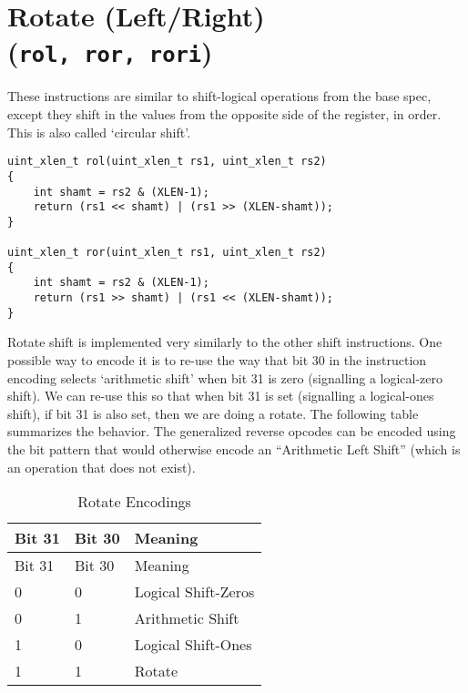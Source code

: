 \section{Rotate (Left/Right) (\texttt{rol,\ ror,\ rori})}

These instructions are similar to shift-logical operations from the base
spec, except they shift in the values from the opposite side of the
register, in order. This is also called `circular shift'.

\begin{verbatim}
uint_xlen_t rol(uint_xlen_t rs1, uint_xlen_t rs2)
{
    int shamt = rs2 & (XLEN-1);
    return (rs1 << shamt) | (rs1 >> (XLEN-shamt));
}

uint_xlen_t ror(uint_xlen_t rs1, uint_xlen_t rs2)
{
    int shamt = rs2 & (XLEN-1);
    return (rs1 >> shamt) | (rs1 << (XLEN-shamt));
}
\end{verbatim}



Rotate shift is implemented very similarly to the other shift
instructions. One possible way to encode it is to re-use the way that
bit 30 in the instruction encoding selects `arithmetic shift' when bit
31 is zero (signalling a logical-zero shift). We can re-use this so that
when bit 31 is set (signalling a logical-ones shift), if bit 31 is also
set, then we are doing a rotate. The following table summarizes the
behavior. The generalized reverse opcodes can be encoded using the
bit pattern that would otherwise encode an ``Arithmetic Left Shift''
(which is an operation that does not exist).

\begin{longtable}[c]{@{}lll@{}}
\caption{Rotate Encodings}\tabularnewline
\toprule
Bit 31 & Bit 30 & Meaning\tabularnewline
\midrule
\endfirsthead
\toprule
Bit 31 & Bit 30 & Meaning\tabularnewline
\midrule
\endhead
0 & 0 & Logical Shift-Zeros\tabularnewline
0 & 1 & Arithmetic Shift\tabularnewline
1 & 0 & Logical Shift-Ones\tabularnewline
1 & 1 & Rotate\tabularnewline
\bottomrule
\end{longtable}

%
%
%
%
%

